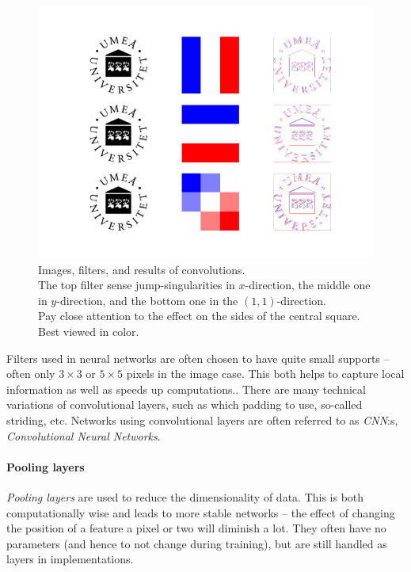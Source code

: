 \documentclass{article}
\begin{document}
\begin{figure}
    \centering
    \begin{minipage}{.75\linewidth}
    \includegraphics[width=0.99\linewidth]{graphics/filter_fig.png}
    \end{minipage}\begin{minipage}{.24\linewidth}
        \caption{Images, filters, and results of convolutions. \\ The top filter sense jump-singularities in $x$-direction, the middle one in $y$-direction, and the bottom one in the $(1,1)$-direction. \\ Pay close attention to the effect on the sides of the central square. Best viewed in color. } \label{fig:filter}
    \end{minipage}
    
    \label{fig:filter}
\end{figure}

Filters used in neural networks are often chosen to have quite small supports -- often only $3\times 3$ or $5 \times 5$ pixels in the image case. This both helps to capture local information as well as speeds up computations.. There are many technical variations of convolutional layers, such as which padding to use, so-called striding, etc. Networks using convolutional layers are often referred to as \emph{CNN}:s, \emph{Convolutional Neural Networks}.





\paragraph{Pooling layers} \emph{Pooling layers} are used to reduce the dimensionality of data. This is both computationally wise and leads to more stable networks -- the effect of changing the position of a feature a pixel or two will diminish a lot. They often have no parameters (and hence to not change during training), but are still handled as layers in implementations.
\end{document}
